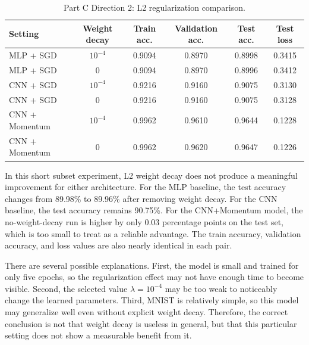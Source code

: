 \documentclass[11pt]{article}
\begin{document}
\begin{table}[H]
\centering
\caption{Part C Direction 2: L2 regularization comparison.}
\label{tab:regularization}
\begin{tabular}{lccccc}
\toprule
Setting & Weight decay & Train acc. & Validation acc. & Test acc. & Test loss \\
\midrule
MLP + SGD & $10^{-4}$ & 0.9094 & 0.8970 & 0.8998 & 0.3415 \\
MLP + SGD & 0 & 0.9094 & 0.8970 & 0.8996 & 0.3412 \\
CNN + SGD & $10^{-4}$ & 0.9216 & 0.9160 & 0.9075 & 0.3130 \\
CNN + SGD & 0 & 0.9216 & 0.9160 & 0.9075 & 0.3128 \\
CNN + Momentum & $10^{-4}$ & 0.9962 & 0.9610 & 0.9644 & 0.1228 \\
CNN + Momentum & 0 & 0.9962 & 0.9620 & 0.9647 & 0.1226 \\
\bottomrule
\end{tabular}
\end{table}

In this short subset experiment, L2 weight decay does not produce a meaningful improvement for either architecture. For the MLP baseline, the test accuracy changes from 89.98\% to 89.96\% after removing weight decay. For the CNN baseline, the test accuracy remains 90.75\%. For the CNN+Momentum model, the no-weight-decay run is higher by only 0.03 percentage points on the test set, which is too small to treat as a reliable advantage. The train accuracy, validation accuracy, and loss values are also nearly identical in each pair.

There are several possible explanations. First, the model is small and trained for only five epochs, so the regularization effect may not have enough time to become visible. Second, the selected value $\lambda=10^{-4}$ may be too weak to noticeably change the learned parameters. Third, MNIST is relatively simple, so this model may generalize well even without explicit weight decay. Therefore, the correct conclusion is not that weight decay is useless in general, but that this particular setting does not show a measurable benefit from it.
\end{document}
